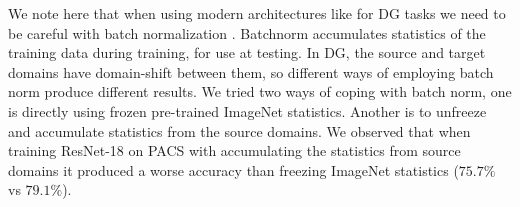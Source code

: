 \documentclass[10pt,twocolumn,letterpaper]{article}
\begin{document}
We note here that when using modern architectures like \cite{Szegedy2016inceptionv3, He2016resnet} for DG tasks we need to be careful with batch normalization \cite{Ioffe2015bn}. Batchnorm accumulates statistics of the training data during training, for use at testing. In DG, the source and target domains have domain-shift between them, so different ways of employing batch norm produce different results. We tried two ways of coping with batch norm, one is directly using frozen pre-trained ImageNet statistics. Another  is to unfreeze and accumulate statistics from the source domains. We observed that when training  ResNet-18 on PACS with accumulating the statistics from source domains it produced a worse accuracy than freezing ImageNet statistics ($75.7\%$ vs $79.1\%$).





























\begin{table}[t]
\centering
{}
\vspace{-0.3cm}
\caption{\small Cross-domain object recognition results (accuracy. \%) of different methods on PACS using ResNet-18. Best in bold.}
\label{tab:agg-resnet-pacs}
      \vspace{-0.3cm}
\end{table}
\end{document}
